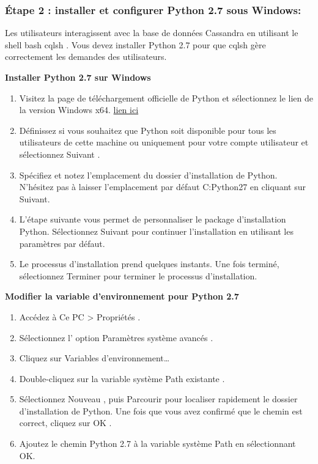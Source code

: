 \subsubsection {Étape 2 : installer et configurer Python 2.7 sous Windows:}

Les utilisateurs interagissent avec la base de données Cassandra en utilisant le shell bash cqlsh . Vous devez installer Python 2.7 pour que cqlsh gère correctement les demandes des utilisateurs.

\textbf{Installer Python 2.7 sur Windows}

\begin{enumerate}
\item Visitez la page de téléchargement officielle de Python et sélectionnez le lien de la version Windows x64. \href{https://www.python.org/downloads/release/python-2718/}{lien ici}
\item Définissez si vous souhaitez que Python soit disponible pour tous les utilisateurs de cette machine ou uniquement pour votre compte utilisateur et sélectionnez Suivant .
\item Spécifiez et notez l'emplacement du dossier d'installation de Python. N'hésitez pas à laisser l'emplacement par défaut C:Python27 en cliquant sur Suivant.
\item L'étape suivante vous permet de personnaliser le package d'installation Python. Sélectionnez Suivant pour continuer l'installation en utilisant les paramètres par défaut.
\item Le processus d'installation prend quelques instants. Une fois terminé, sélectionnez Terminer pour terminer le processus d'installation.
\end{enumerate}

\textbf{Modifier la variable d'environnement pour Python 2.7}
\begin{enumerate}
\item Accédez à Ce PC > Propriétés .
\item Sélectionnez l' option Paramètres système avancés .
\item Cliquez sur Variables d'environnement…
\item Double-cliquez sur la variable système Path existante .
\item Sélectionnez Nouveau , puis Parcourir pour localiser rapidement le dossier d'installation de Python. Une fois que vous avez confirmé que le chemin est correct, cliquez sur OK .
\item Ajoutez le chemin Python 2.7 à la variable système Path en sélectionnant OK.
\end{enumerate}